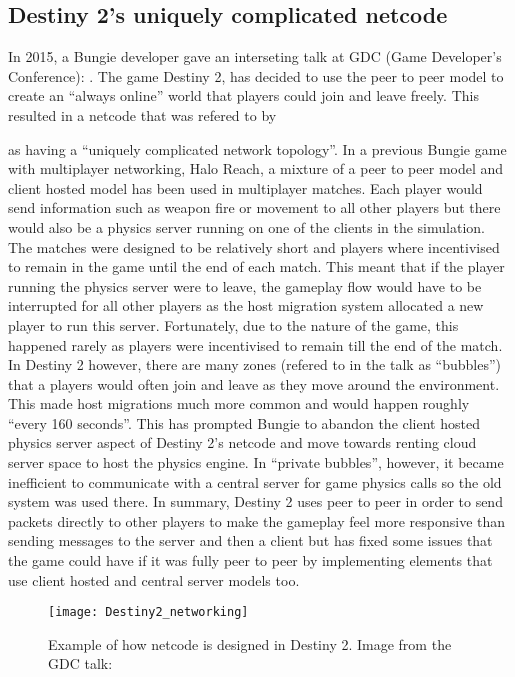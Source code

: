 \subsection{Destiny 2's uniquely complicated netcode}
In 2015, a Bungie developer gave an interseting talk at GDC (Game Developer's Conference): . The game Destiny 2, has decided to use the peer to peer model to create an ``always online'' world that players could join and leave freely. This resulted in a netcode that was refered to by \author{truman2015destiny2} as having a  ``uniquely complicated network topology''. In a previous Bungie game with multiplayer networking, Halo Reach,  a mixture of a peer to peer model and client hosted model has been used in multiplayer matches. Each player would send information such as weapon fire or movement to all other players but there would also be a physics server running on one of the clients in the simulation. The matches were designed to be relatively short and players where incentivised to remain in the game until the end of each match. This meant that if the player running the physics server were to leave, the gameplay flow would have to be interrupted for all other players as the host migration system allocated a new player to run this server. Fortunately, due to the nature of the game, this happened rarely as players were incentivised to remain till the end of the match. In Destiny 2 however, there are many zones (refered to in the talk as ``bubbles'') that a players would often join and leave as they move around the environment. This made host migrations much more common and would happen roughly ``every 160 seconds''. This has prompted Bungie to abandon the client hosted physics server aspect of Destiny 2's netcode and move towards renting cloud server space to host the physics engine. In ``private bubbles'', however, it became inefficient to communicate with a central server for game physics calls so the old system was used there. In summary, Destiny 2 uses peer to peer in order to send packets directly to other players to make the gameplay feel more responsive than sending messages to the server and then a client but has fixed some issues that the game could have if it was fully peer to peer by implementing elements that use client hosted and central server models too.

\begin{figure}[!h]
  \centering
  \texttt{[image: Destiny2\_networking]}
  \caption{Example of how netcode is designed in Destiny 2. Image from the GDC talk: }
  \label{fig:destiny2netcode}
\end{figure}

